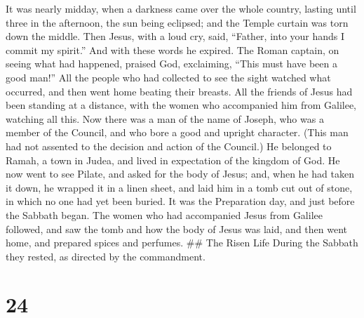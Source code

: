  It was nearly midday, when a darkness came over the whole
country, lasting until three in the afternoon,  the sun
being eclipsed; and the Temple curtain was torn down the middle.
 Then Jesus, with a loud cry, said, ``Father, into your
hands I commit my spirit.'' And with these words he expired.
 The Roman captain, on seeing what had happened, praised
God, exclaiming, ``This must have been a good man!''  All
the people who had collected to see the sight watched what occurred, and
then went home beating their breasts.  All the friends of
Jesus had been standing at a distance, with the women who accompanied
him from Galilee, watching all this.  Now there was a man
of the name of Joseph, who was a member of the Council, and who bore a
good and upright character.  (This man had not assented to
the decision and action of the Council.) He belonged to Ramah, a town in
Judea, and lived in expectation of the kingdom of God.  He
now went to see Pilate, and asked for the body of Jesus; 
and, when he had taken it down, he wrapped it in a linen sheet, and laid
him in a tomb cut out of stone, in which no one had yet been buried.
 It was the Preparation day, and just before the Sabbath
began.  The women who had accompanied Jesus from Galilee
followed, and saw the tomb and how the body of Jesus was laid,
 and then went home, and prepared spices and perfumes. \#\#
The Risen Life During the Sabbath they rested, as directed by the
commandment.

\hypertarget{section-22}{%
\section{24}\label{section-22}}

